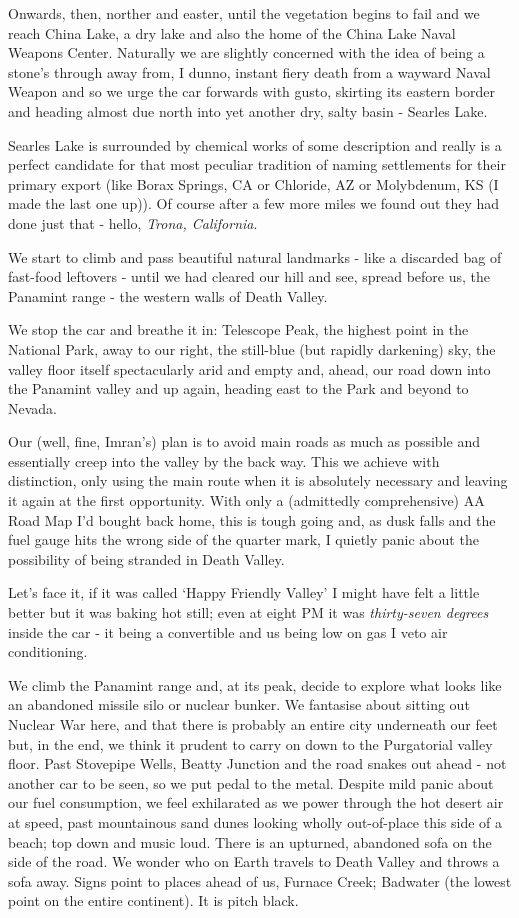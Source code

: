 \documentclass[a5paper,titlepage,11pt]{book}
\begin{document}
Onwards, then, norther and easter, until the vegetation begins to fail and we reach China Lake, a dry lake and also the home of the China Lake Naval Weapons Center. Naturally we are slightly concerned with the idea of being a stone's through away from, I dunno, instant fiery death from a wayward Naval Weapon and so we urge the car forwards with gusto, skirting its eastern border and heading almost due north into yet another dry, salty basin - Searles Lake.

Searles Lake is surrounded by chemical works of some description and really is a perfect candidate for that most peculiar tradition of naming settlements for their primary export (like Borax Springs, CA or Chloride, AZ or Molybdenum, KS (I made the last one up)). Of course after a few more miles we found out they had done just that - hello, \emph{Trona, California}.

We start to climb and pass beautiful natural landmarks - like a discarded bag of fast-food leftovers - until we had cleared our hill and see, spread before us, the Panamint range - the western walls of Death Valley.

We stop the car and breathe it in: Telescope Peak, the highest point in the National Park, away to our right, the still-blue (but rapidly darkening) sky, the valley floor itself spectacularly arid and empty and, ahead, our road down into the Panamint valley and up again, heading east to the Park and beyond to Nevada.

Our (well, fine, Imran's) plan is to avoid main roads as much as possible and essentially creep into the valley by the back way. This we achieve with distinction, only using the main route when it is absolutely necessary and leaving it again at the first opportunity. With only a (admittedly comprehensive) AA Road Map I'd bought back home, this is tough going and, as dusk falls and the fuel gauge hits the wrong side of the quarter mark, I quietly panic about the possibility of being stranded in Death Valley.

Let's face it, if it was called `Happy Friendly Valley' I might have felt a little better but it was baking hot still; even at eight PM it was \emph{thirty-seven degrees} inside the car - it being a convertible and us being low on gas I veto air conditioning.

We climb the Panamint range and, at its peak, decide to explore what looks like an abandoned missile silo or nuclear bunker. We fantasise about sitting out Nuclear War here, and that there is probably an entire city underneath our feet but, in the end, we think it prudent to carry on down to the Purgatorial valley floor. Past Stovepipe Wells, Beatty Junction and the road snakes out ahead - not another car to be seen, so we put pedal to the metal. Despite mild panic about our fuel consumption, we feel exhilarated as we power through the hot desert air at speed, past mountainous sand dunes looking wholly out-of-place this side of a beach; top down and music loud. There is an upturned, abandoned sofa on the side of the road. We wonder who on Earth travels to Death Valley and throws a sofa away. Signs point to places ahead of us, Furnace Creek; Badwater (the lowest point on the entire continent). It is pitch black.
\end{document}
